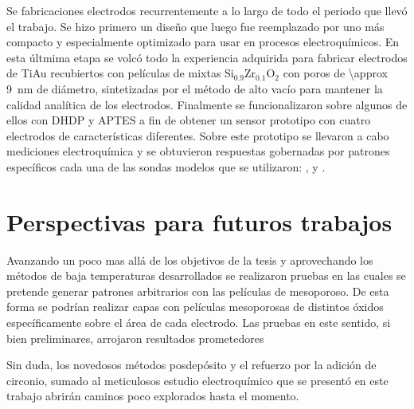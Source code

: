 Se fabricaciones electrodos recurrentemente a lo largo de todo el periodo que llevó el trabajo. Se hizo primero un diseño que luego fue reemplazado por uno más compacto y especialmente optimizado para usar en procesos electroquímicos. En esta últmima etapa se volcó todo la experiencia adquirida para fabricar electrodos de Ti\textbar Au  recubiertos con películas de mixtas Si$_{0.9}$Zr$_{0.1}$O$_2$ con poros de \SI{\approx 9}{\nm} de diámetro, sintetizadas por el método de alto vacío para mantener la calidad analítica de los electrodos. Finalmente se funcionalizaron sobre algunos de ellos con DHDP y APTES a fin de obtener un sensor prototipo con cuatro electrodos de características diferentes. Sobre este prototipo se llevaron a cabo mediciones electroquímica y se obtuvieron respuestas gobernadas por patrones específicos cada una de las sondas modelos que se utilizaron: \ferroferri, \ferroceno\space y \aminorutenio.   



\section*{Perspectivas para futuros trabajos}


Avanzando un poco mas allá de los objetivos de la tesis y aprovechando los métodos de baja temperaturas desarrollados se realizaron pruebas en las cuales se pretende generar patrones arbitrarios con las películas de mesoporoso. De esta forma se podrían realizar capas con películas mesoporosas de distintos óxidos específicamente sobre el área de cada electrodo. Las pruebas en este sentido, si bien preliminares, arrojaron resultados prometedores

Sin duda, los novedosos métodos posdepósito y el refuerzo por la adición de circonio, sumado al meticulosos estudio electroquímico que se presentó en este trabajo abrirán caminos poco explorados hasta el momento.

